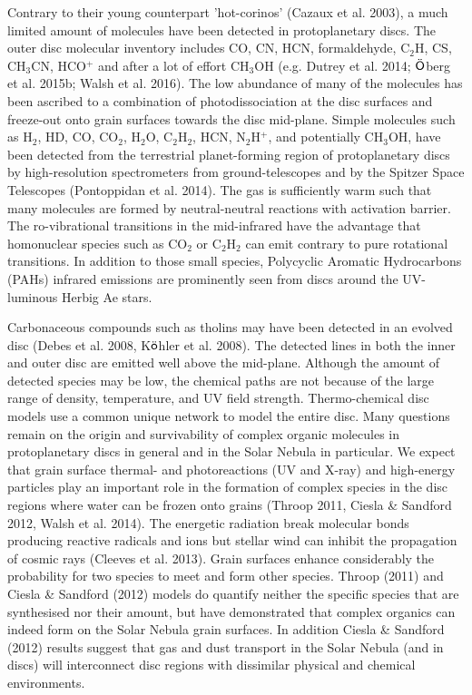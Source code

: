 \documentclass[10pt,fleqn,twoside]{article}
\begin{document}
Contrary to their young counterpart 'hot-corinos' (Cazaux et al. 2003), a much limited amount of molecules have been detected in protoplanetary discs. The outer disc molecular inventory includes CO, CN, HCN, formaldehyde, C$_2$H, CS, CH$_3$CN, HCO$^+$ and after a lot of effort CH$_3$OH (e.g. Dutrey et al. 2014;  $\ddot{\textsf O}$berg et al. 2015b; Walsh et al. 2016). The low abundance of many of the molecules has been ascribed to a combination of photodissociation at the disc surfaces and freeze-out onto grain surfaces towards the disc mid-plane. Simple molecules such as H$_2$, HD, CO, CO$_2$, H$_2$O, C$_2$H$_2$, HCN, N$_2$H$^+$, and potentially CH$_3$OH, have been detected from the terrestrial planet-forming region of protoplanetary discs by high-resolution spectrometers from ground-telescopes and by the Spitzer Space Telescopes (Pontoppidan et al. 2014). The gas is sufficiently warm such that many molecules are formed by neutral-neutral reactions with activation barrier. The ro-vibrational transitions in the mid-infrared have the advantage that homonuclear species such as CO$_2$ or C$_2$H$_2$ can emit contrary to pure rotational transitions. In addition to those small species, Polycyclic Aromatic Hydrocarbons (PAHs) infrared emissions are prominently seen from discs around the UV-luminous Herbig Ae stars. 

Carbonaceous compounds such as tholins may have been detected in an evolved disc (Debes et al. 2008, K$\ddot{\textsf o}$hler et al. 2008). The detected lines in both the inner and outer disc are emitted well above the mid-plane. Although the amount of detected species may be low, the chemical paths are not because of the large range of density, temperature, and UV field strength. Thermo-chemical disc models use a common unique network to model the entire disc. Many questions remain on the origin and survivability of complex organic molecules in protoplanetary discs in general and in the Solar Nebula in particular. We expect that grain surface thermal- and photoreactions (UV and X-ray) and high-energy particles play an important role in the formation of complex species in the disc regions where water can be frozen onto grains (Throop 2011, Ciesla \& Sandford 2012, Walsh et al. 2014). The energetic radiation break molecular bonds producing reactive radicals and ions but stellar wind can inhibit the propagation of cosmic rays (Cleeves et al. 2013). Grain surfaces enhance considerably the probability for two species to meet and form other species. Throop (2011) and Ciesla \& Sandford (2012) models do quantify neither the specific species that are synthesised nor their amount, but have demonstrated that complex organics can indeed form on the Solar Nebula grain surfaces. In addition Ciesla \& Sandford (2012) results suggest that gas and dust transport in the Solar Nebula (and in discs) will interconnect disc regions with dissimilar physical and chemical environments.
\end{document}
